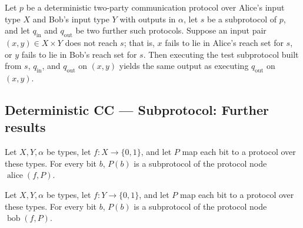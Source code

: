 \begin{lemma}
\label{CommunicationComplexity.Deterministic.Protocol.testSubprotocol_run_outside}
\leanok
{}
Let $p$ be a deterministic two-party communication protocol over Alice's input type $X$
and Bob's input type $Y$ with outputs in $\alpha$, let $s$ be a subprotocol of $p$, and
let $q_{\mathrm{in}}$ and $q_{\mathrm{out}}$ be two further such protocols. Suppose an
input pair $(x, y) \in X \times Y$ does not reach $s$; that is, $x$ fails to lie in
Alice's reach set for $s$, or $y$ fails to lie in Bob's reach set for $s$. Then
executing the test subprotocol built from $s$, $q_{\mathrm{in}}$, and $q_{\mathrm{out}}$
on $(x, y)$ yields the same output as executing $q_{\mathrm{out}}$ on $(x, y)$.
\end{lemma}

\subsection*{Deterministic CC --- Subprotocol: Further results}

\begin{lemma}
\label{CommunicationComplexity.Deterministic.Protocol.IsSubprotocol.alice_child}
\leanok
{}
Let $X,Y,\alpha$ be types, let $f:X\to\{0,1\}$, and let $P$ map each bit to a protocol
over these types. For every bit $b$, $P(b)$ is a subprotocol of the protocol node
$\operatorname{alice}(f,P)$.
\end{lemma}

\begin{lemma}
\label{CommunicationComplexity.Deterministic.Protocol.IsSubprotocol.bob_child}
\leanok
{}
Let $X,Y,\alpha$ be types, let $f:Y\to\{0,1\}$, and let $P$ map each bit to a protocol
over these types. For every bit $b$, $P(b)$ is a subprotocol of the protocol node
$\operatorname{bob}(f,P)$.
\end{lemma}

